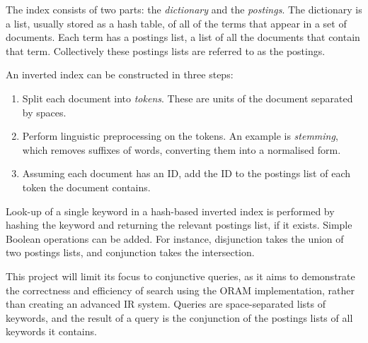 \documentclass[12pt,a4paper,twoside,openright]{report}
\begin{document}
The index consists of two parts: the \emph{dictionary} and the \emph{postings}. The dictionary is a list, usually stored as a hash table, of all of the terms that appear in a set of documents. Each term has a postings list, a list of all the documents that contain that term. Collectively these postings lists are referred to as the postings.

An inverted index can be constructed in three steps:
\begin{enumerate}
    \item Split each document into \emph{tokens}. These are units of the document separated by spaces.
    \item Perform linguistic preprocessing on the tokens. An example is \emph{stemming}, which removes suffixes of words, converting them into a normalised form.
    \item Assuming each document has an ID, add the ID to the postings list of each token the document contains.
\end{enumerate}

Look-up of a single keyword in a hash-based inverted index is performed by hashing the keyword and returning the relevant postings list, if it exists. Simple Boolean operations can be added. For instance, disjunction takes the union of two postings lists, and conjunction takes the intersection.

This project will limit its focus to conjunctive queries, as it aims to demonstrate the correctness and efficiency of search using the ORAM implementation, rather than creating an advanced IR system. Queries are space-separated lists of keywords, and the result of a query is the conjunction of the postings lists of all keywords it contains.
\end{document}
